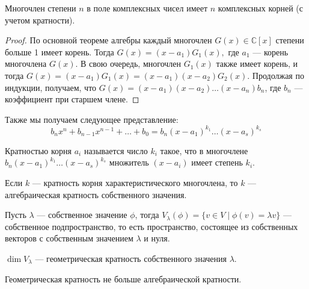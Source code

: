 \begin{Theorem}
	Многочлен степени $n$ в поле комплексных чисел имеет $n$ комплексных корней (с учетом кратности).
\end{Theorem}

\begin{proof}
	По основной теореме алгебры каждый многочлен $G(x) \in \mathbb{C}[x]$ степени больше 1 имеет корень. Тогда $G(x) = (x - a_1)G_1(x),$ где $a_1$ --- корень многочлена $G(x)$. В свою очередь, многочлен $G_1(x)$ также имеет корень, и тогда $G(x) = (x - a_1)G_1(x) = (x - a_1)(x - a_2)G_2(x)$. Продолжая по индукции, получаем, что $G(x) = (x - a_1)(x - a_2)\ldots(x - a_n)b_n$, где $b_n$ --- коэффициент при старшем члене.
\end{proof}

Также мы получаем следующее представление:
$$
b_nx^n + b_{n-1}x^{n-1} + \ldots + b_0 = b_n(x - a_1)^{k_1}\ldots(x - a_s)^{k_s}
$$

\begin{Def}
	Кратностью корня $a_i$ называется число $k_i$ такое, что в многочлене \\$b_n(x - a_1)^{k_1}\ldots(x - a_s)^{k_s}$ множитель $(x - a_i)$ имеет степень $k_i$.
\end{Def}

\begin{Def}
	Если $k$ --- кратность корня характеристического многочлена, то $k$ --- алгебраическая кратность собственного значения.
\end{Def}

\begin{Def}
	Пусть $\lambda$ --- собственное значение $\phi$, тогда $V_\lambda(\phi) = \{v \in V \; | \; \phi(v) = \lambda v\}$ --- собственное подпространство, то есть пространство, состоящее из собственных векторов с собственным значением $\lambda$ и нуля.
\end{Def}

\begin{Def}
	$\dim V_\lambda$ --- геометрическая кратность собственного значения $\lambda$.
\end{Def}

\begin{Suggestion}
	Геометрическая кратность не больше алгебраической кратности.
\end{Suggestion}

